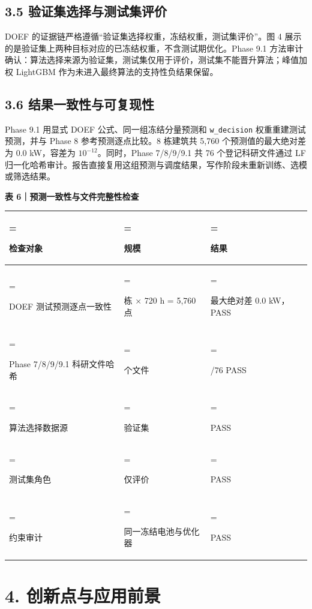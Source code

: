 \documentclass[12pt,a4paper]{article}
\begin{document}
\subsection{3.5 验证集选择与测试集评价}
DOEF 的证据链严格遵循“验证集选择权重，冻结权重，测试集评价”。图 4 展示的是验证集上两种目标对应的已冻结权重，不含测试期优化。Phase 9.1 方法审计确认：算法选择来源为验证集，测试集仅用于评价，测试集不能晋升算法；峰值加权 LightGBM 作为未进入最终算法的支持性负结果保留。\par
\subsection{3.6 结果一致性与可复现性}
Phase 9.1 用显式 DOEF 公式、同一组冻结分量预测和 \nolinkurl{w_decision} 权重重建测试预测，并与 Phase 8 参考预测逐点比较。8 栋建筑共 5,760 个预测值的最大绝对差为 0.0 kW，容差为 \(10^{-12}\)。同时，Phase 7/8/9/9.1 共 76 个登记科研文件通过 LF 归一化哈希审计。报告直接复用这组预测与调度结果，写作阶段未重新训练、选模或筛选结果。\par
\par\noindent\begin{minipage}{\linewidth}\textbf{表 6｜预测一致性与文件完整性检查}\par\smallskip\renewcommand{\arraystretch}{1.2}\begin{tabularx}{\linewidth}{>{\hsize=1.4\hsize\linewidth=\hsize\raggedright\arraybackslash}X>{\hsize=0.8\hsize\linewidth=\hsize\raggedright\arraybackslash}X>{\hsize=0.8\hsize\linewidth=\hsize\raggedright\arraybackslash}X}\toprule
检查对象 & 规模 & 结果\\\midrule
DOEF 测试预测逐点一致性 & 8 栋 × 720 h = 5,760 点 & 最大绝对差 0.0 kW，PASS\\
Phase 7/8/9/9.1 科研文件哈希 & 76 个文件 & 76/76 PASS\\
算法选择数据源 & 验证集 & PASS\\
测试集角色 & 仅评价 & PASS\\
约束审计 & 同一冻结电池与优化器 & PASS\\
\bottomrule\end{tabularx}\end{minipage}\par
\section{4. 创新点与应用前景}
\end{document}
